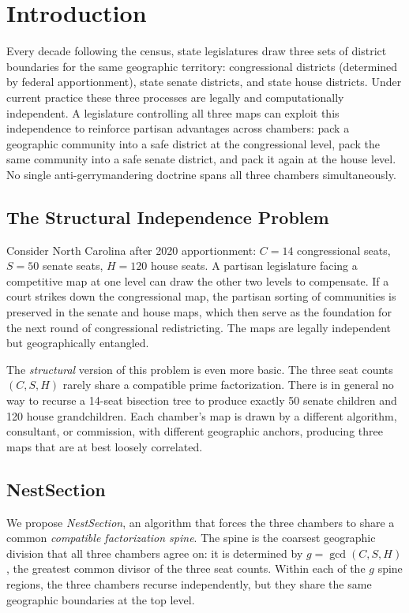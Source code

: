 \section{Introduction}
\label{sec:intro}

Every decade following the census, state legislatures draw three sets of
district boundaries for the same geographic territory: congressional districts
(determined by federal apportionment), state senate districts, and state house
districts.  Under current practice these three processes are legally and
computationally independent.  A legislature controlling all three maps can
exploit this independence to reinforce partisan advantages across chambers: pack
a geographic community into a safe district at the congressional level, pack the
same community into a safe senate district, and pack it again at the house
level.  No single anti-gerrymandering doctrine spans all three chambers
simultaneously.

\subsection{The Structural Independence Problem}

Consider North Carolina after 2020 apportionment: $C = 14$ congressional
seats, $S = 50$ senate seats, $H = 120$ house seats.  A partisan legislature
facing a competitive map at one level can draw the other two levels to
compensate.  If a court strikes down the congressional map, the partisan sorting
of communities is preserved in the senate and house maps, which then serve as
the foundation for the next round of congressional redistricting.  The maps are
legally independent but geographically entangled.

The \emph{structural} version of this problem is even more basic.  The three
seat counts $(C, S, H)$ rarely share a compatible prime factorization.  There is
in general no way to recurse a 14-seat bisection tree to produce exactly 50
senate children and 120 house grandchildren.  Each chamber's map is drawn by a
different algorithm, consultant, or commission, with different geographic
anchors, producing three maps that are at best loosely correlated.

\subsection{NestSection}

We propose \emph{NestSection}, an algorithm that forces the three chambers to
share a common \emph{compatible factorization spine}.  The spine is the
coarsest geographic division that all three chambers agree on: it is
determined by $g = \gcd(C, S, H)$, the greatest common divisor of the three
seat counts.  Within each of the $g$ spine regions, the three chambers recurse
independently, but they share the same geographic boundaries at the top level.

